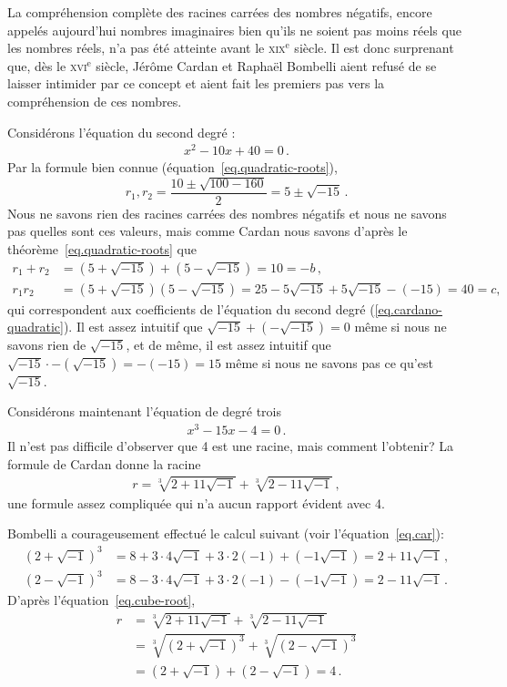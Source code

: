 La compréhension complète des racines carrées des nombres négatifs, encore appelés aujourd'hui nombres imaginaires  bien qu'ils ne soient pas moins réels que les nombres réels, n'a pas été atteinte avant le \textsc{xix}$^\text{e}$ siècle. Il est donc surprenant que, dès le \textsc{xvi}$^\text{e}$ siècle, Jérôme Cardan et Raphaël Bombelli  aient refusé de se laisser intimider par ce concept et aient fait les premiers pas vers la compréhension de ces nombres.

Considérons l'équation du second degré :
\begin{align}
x^2-10x+40=0\,.\label{eq.cardano-quadratic}
\end{align}
Par la formule bien connue (équation~\ref{eq.quadratic-roots}),
\[
r_1, r_2=\displaystyle\frac{10\pm\sqrt{100-160}}{2}=5\pm\sqrt{-15}\,.
\]
Nous ne savons rien des racines carrées des nombres négatifs et nous ne savons pas quelles sont ces valeurs, mais comme Cardan nous savons d'après le théorème~\ref{eq.quadratic-roots} que 
\begin{align*}
r_1+r_2&=(5+\sqrt{-15})+(5-\sqrt{-15})=10=-b\,,\\
r_1r_2&=(5+\sqrt{-15})(5-\sqrt{-15})=25-5\sqrt{-15}+5\sqrt{-15}-(-15)=40=c,
\end{align*}
qui correspondent aux coefficients de l'équation du second degré (\ref{eq.cardano-quadratic}). Il est assez intuitif que $\sqrt{-15}+(-\sqrt{-15})=0$ même si nous ne savons rien de $\sqrt{-15}$, et de même, il est assez intuitif que $\sqrt{-15}\cdot-(\sqrt{-15})=-(-15)=15$ même si nous ne savons pas ce qu'est $\sqrt{-15}$.

\enlargethispage{\baselineskip}

Considérons maintenant l'équation de degré trois
\begin{align}
x^3-15x-4=0\,.\label{eq.bombelli-cubic}
\end{align}
Il n'est pas difficile d'observer que 4 est une racine, mais comment l'obtenir? La formule de Cardan donne la racine 
\begin{align}
r=\sqrt[3]{2+11\sqrt{-1}}+\sqrt[3]{2-11\sqrt{-1}}\,,\label{eq.cube-root}
\end{align}
une formule assez compliquée qui n'a aucun rapport évident avec 4. 

Bombelli a courageusement effectué le calcul suivant (voir l'équation~\ref{eq.car}):
\begin{align*}
(2+\sqrt{-1})^3&=
8+3\cdot 4\sqrt{-1}+3\cdot 2(-1)+(-1\sqrt{-1})=
2+11\sqrt{-1}\,,\\
(2-\sqrt{-1})^3&=
8-3\cdot 4\sqrt{-1}+3\cdot 2(-1)-(-1\sqrt{-1})=
2-11\sqrt{-1}\,.
\end{align*}
D'après l'équation~\ref{eq.cube-root},
\begin{align*}
r&=\sqrt[3]{2+11\sqrt{-1}} + \sqrt[3]{2-11\sqrt{-1}}\\
&=\sqrt[3]{(2+\sqrt{-1})^3} + \sqrt[3]{(2-\sqrt{-1})^3}\\
&=(2+\sqrt{-1}) + (2-\sqrt{-1})=4\,.
\end{align*}


